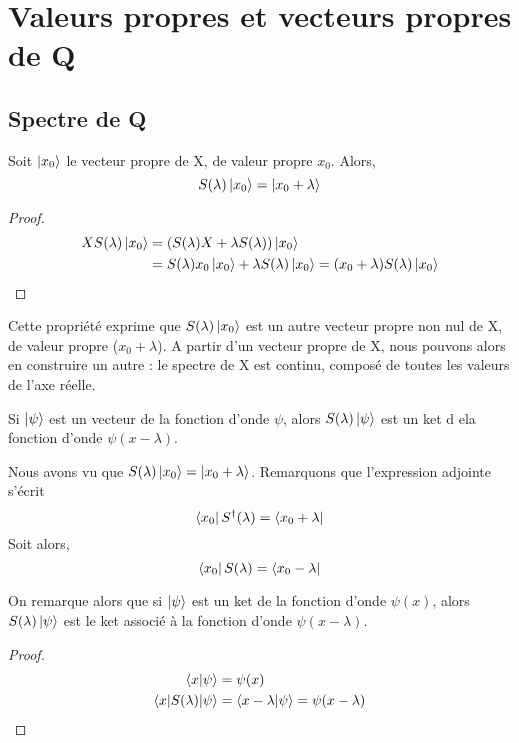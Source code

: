 \documentclass[../Notesdecours.tex]{subfiles}
\begin{document}
\section{Valeurs propres et vecteurs propres de Q}
\subsection{Spectre de Q}

\begin{Property}
	Soit $\ket{x_0}$ le vecteur propre de X, de valeur propre $x_0$. Alors,
	\begin{equation}
		S(\lambda)\ket{x_0} = \ket{x_0+\lambda}
	\end{equation}
\end{Property}
\begin{proof}
	\begin{align*}
		XS(\lambda)\ket{x_0} &= (S(\lambda)X+\lambda S(\lambda))\ket{x_0}\\
		&= S(\lambda)x_0\ket{x_0} + \lambda S(\lambda)\ket{x_0} = (x_0+\lambda)S(\lambda)\ket{x_0}
	\end{align*}
\end{proof}

Cette propriété exprime que $S(\lambda)\ket{x_0}$ est un autre vecteur propre non nul de X, de valeur propre ($x_0+\lambda$). A partir d'un vecteur propre de X, nous pouvons alors en construire un autre : le spectre de X est continu, composé de toutes les valeurs de l'axe réelle.

\begin{Property}
	Si $\ket{\psi}$ est un vecteur de la fonction d'onde $\psi$, alors $S(\lambda)\ket{\psi}$ est un ket d ela fonction d'onde $\psi(x-\lambda)$.
\end{Property}

\begin{remark}
	Nous avons vu que $S(\lambda)\ket{x_0} = \ket{x_0+\lambda}$. Remarquons que l'expression adjointe s'écrit
	\begin{equation}
		\bra{x_0}S^\dagger (\lambda) = \bra{x_0+\lambda}
	\end{equation}
	Soit alors,
	\begin{equation}
		\bra{x_0}S(\lambda) = \bra{x_0-\lambda}
	\end{equation}
\end{remark}

\begin{Property}
	On remarque alors que si $\ket{\psi}$ est un ket de la fonction d'onde $\psi(x)$, alors $S(\lambda)\ket{\psi}$ est le ket associé à la fonction d'onde $\psi(x-\lambda)$.
\end{Property}
\begin{proof}
	\begin{align*}
		\braket{x|\psi} &= \psi(x)\\
		\braket{x|S(\lambda)|\psi} &= \braket{x-\lambda|\psi} = \psi(x-\lambda)
	\end{align*}
\end{proof}
\end{document}
